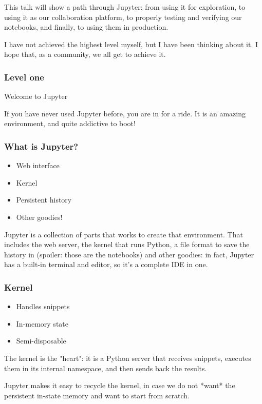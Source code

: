 This talk will show a path through Jupyter:
from using it for exploration,
to using it as our collaboration platform,
to properly testing and verifying our notebooks,
and finally, to using them in production.

I have not achieved the highest level myself,
but I have been thinking about it.
I hope that,
as a community,
we all get to achieve it.

\begin{frame}
\frametitle{Level one}

Welcome to Jupyter
\end{frame}

If you have never used Jupyter before,
you are in for a ride.
It is an amazing environment,
and quite addictive to boot!

\begin{frame}
\frametitle{What is Jupyter?}

\begin{itemize}
\item Web interface
\item Kernel
\item Persistent history
\item Other goodies!
\end{itemize}

\end{frame}

Jupyter is a collection of parts that works to create that environment.
That includes the web server,
the kernel that runs Python,
a file format to save the history in
(spoiler: those are the notebooks)
and other goodies:
in fact,
Jupyter has a built-in terminal and editor,
so it's a complete IDE in one.

\begin{frame}
\frametitle{Kernel}

\begin{itemize}
\item Handles snippets
\item In-memory state
\item Semi-disposable
\end{itemize}

\end{frame}

The kernel is the "heart":
it is a Python server
that receives snippets,
executes them in its internal namespace,
and then sends back the results.

Jupyter makes it easy to recycle the kernel,
in case we do not *want* the persistent
in-state memory
and want to start from scratch.

